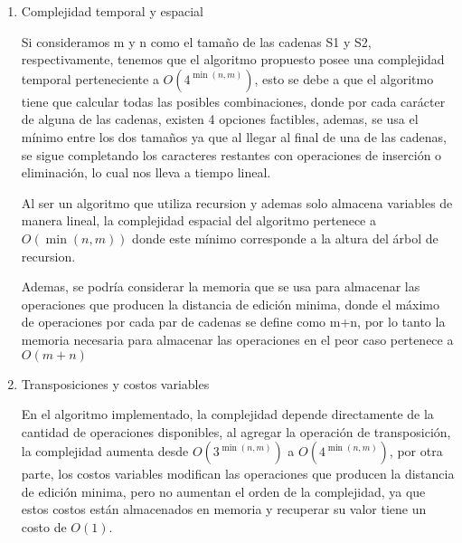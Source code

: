 \begin{enumerate}[1)]
\item Complejidad temporal y espacial

Si consideramos m y n como el tamaño de las cadenas S1 y S2, 
respectivamente, tenemos que
el algoritmo propuesto posee una complejidad temporal 
perteneciente a $O\left(4^{\min(n, m)}\right)$, esto
se debe a que el algoritmo tiene que calcular todas las posibles
combinaciones, donde por cada carácter de alguna de las cadenas, existen
4 opciones factibles, ademas, se usa el mínimo entre los dos tamaños ya que
al llegar al final de una de las cadenas, se sigue completando los caracteres
restantes con operaciones de inserción o eliminación, 
lo cual nos lleva a tiempo lineal.

Al ser un algoritmo que utiliza recursion y ademas solo almacena variables
de manera lineal, la complejidad espacial del algoritmo pertenece a $O\left({\min(n, m)}\right)$ 
donde este mínimo corresponde a la altura del árbol de recursion.

Ademas, se podría considerar la memoria que se usa para almacenar las operaciones
que producen la distancia de edición minima, donde el máximo de operaciones
por cada par de cadenas se define como m+n, por lo tanto la memoria necesaria
para almacenar las operaciones en el peor caso pertenece a $O\left({m+n}\right)$


\item Transposiciones y costos variables

En el algoritmo implementado, la complejidad depende directamente
de la cantidad de operaciones disponibles, al agregar la operación 
de transposición, la complejidad aumenta desde $O\left(3^{\min(n, m)}\right)$ a 
$O\left(4^{\min(n, m)}\right)$, por otra parte, los costos variables
modifican las operaciones que producen la distancia de edición minima, pero no aumentan
el orden de la complejidad, ya que estos costos están almacenados en memoria
y recuperar su valor tiene un costo de $O\left({1}\right)$.

\end{enumerate}